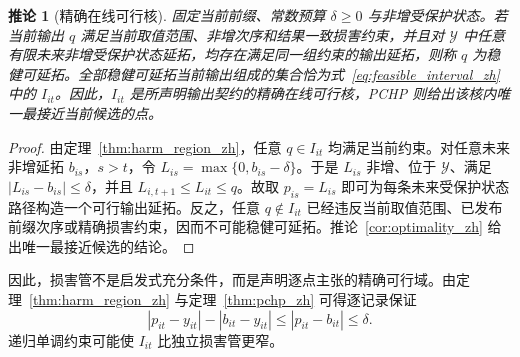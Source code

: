 \documentclass[UTF8,11pt]{ctexart}
\newtheorem{corollary}{推论}
\begin{document}
\begin{corollary}[精确在线可行核]
\label{cor:viability_kernel_zh}
固定当前前缀、常数预算 $\delta\geq0$ 与非增受保护状态。若当前输出 $q$ 满足当前取值范围、非增次序和结果一致损害约束，并且对 $\mathcal Y$ 中任意有限未来非增受保护状态延拓，均存在满足同一组约束的输出延拓，则称 $q$ 为稳健可延拓。全部稳健可延拓当前输出组成的集合恰为式~\eqref{eq:feasible_interval_zh} 中的 $I_{it}$。因此，$I_{it}$ 是所声明输出契约的精确在线可行核，PCHP 则给出该核内唯一最接近当前候选的点。
\end{corollary}
\begin{proof}
由定理~\ref{thm:harm_region_zh}，任意 $q\in I_{it}$ 均满足当前约束。对任意未来非增延拓 $b_{is}$，$s>t$，令 $L_{is}=\max\{0,b_{is}-\delta\}$。于是 $L_{is}$ 非增、位于 $\mathcal Y$、满足 $|L_{is}-b_{is}|\leq\delta$，并且 $L_{i,t+1}\leq L_{it}\leq q$。故取 $p_{is}=L_{is}$ 即可为每条未来受保护状态路径构造一个可行输出延拓。反之，任意 $q\notin I_{it}$ 已经违反当前取值范围、已发布前缀次序或精确损害约束，因而不可能稳健可延拓。推论~\ref{cor:optimality_zh} 给出唯一最接近候选的结论。
\end{proof}

因此，损害管不是启发式充分条件，而是声明逐点主张的精确可行域。由定理~\ref{thm:harm_region_zh} 与定理~\ref{thm:pchp_zh} 可得逐记录保证
\begin{equation}
  |p_{it}-y_{it}|-|b_{it}-y_{it}|
  \leq |p_{it}-b_{it}|\leq\delta.
  \label{eq:pointwise_harm_zh}
\end{equation}
递归单调约束可能使 $I_{it}$ 比独立损害管更窄。
\end{document}
